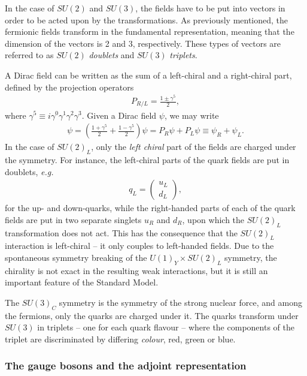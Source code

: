 \documentclass[twoside,english]{uiofysmaster}
\begin{document}
In the case of $SU(2)$ and $SU(3)$, the fields have to be put into vectors in order to be acted upon by the transformations. As previously mentioned, the fermionic fields transform in the fundamental representation, meaning that the dimension of the vectors is 2 and 3, respectively. These types of vectors are referred to as $SU(2)$ {\it doublets} and $SU(3)$ {\it triplets}.

A Dirac field can be written as the sum of a left-chiral and a right-chiral part, defined by the projection operators 
\begin{align}
	P_{R/L} = \frac{1\pm \gamma^5}{2},
\end{align}
where $\gamma^5 \equiv i\gamma^0\gamma^1\gamma^2\gamma^3$. Given a Dirac field $\psi$, we may write
\begin{align}
	\psi = \left( \frac{1 + \gamma^5}{2} + \frac{1 - \gamma^5}{2}\right)\psi = P_R \psi + P_L \psi \equiv \psi_R + \psi_L.
\end{align}
In the case of $SU(2)_L$, only the {\it left chiral} part of the fields are charged under the symmetry. For instance, the left-chiral parts of the quark fields are put in doublets, {\it e.g.}\
\begin{align}
	q_L = \begin{pmatrix}
		u_L \\ d_L
	\end{pmatrix},
\end{align}
for the up- and down-quarks, while the right-handed parts of each of the quark fields are put in two separate singlets $u_R$ and $d_R$, upon which the $SU(2)_L$ transformation does not act. This has the consequence that the $SU(2)_L$ interaction is left-chiral -- it only couples to left-handed fields. Due to the spontaneous symmetry breaking of the $U(1)_Y\times SU(2)_L$ symmetry, the chirality is not exact in the resulting weak interactions, but it is still an important feature of the Standard Model.

The $SU(3)_C$ symmetry is the symmetry of the strong nuclear force, and among the fermions, only the quarks are charged under it. The quarks transform under $SU(3)$ in triplets -- one for each quark flavour -- where the components of the triplet are discriminated by differing {\it colour}, red, green or blue. 

\subsubsection{The gauge bosons and the adjoint representation}
\end{document}
